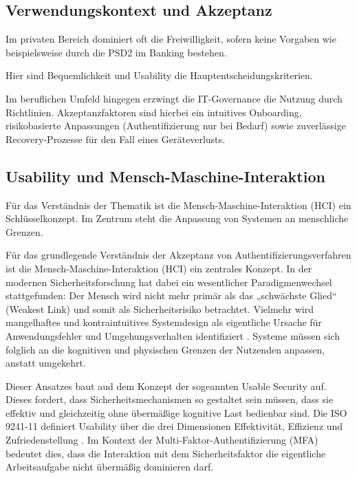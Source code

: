 \subsection{Verwendungskontext und Akzeptanz}
Im privaten Bereich dominiert oft die Freiwilligkeit, sofern keine Vorgaben wie beispielsweise durch die PSD2 im Banking bestehen. %

Hier sind Bequemlichkeit und Usability die Hauptentscheidungskriterien.

Im beruflichen Umfeld hingegen erzwingt die IT-Governance die Nutzung durch Richtlinien. Akzeptanzfaktoren sind hierbei ein intuitives Onboarding, risikobasierte Anpassungen (Authentifizierung nur bei Bedarf) sowie zuverlässige Recovery-Prozesse für den Fall eines Geräteverlusts.

\subsection{Usability und Mensch-Maschine-Interaktion}
Für das Verständnis der Thematik ist die Mensch-Maschine-Interaktion (HCI) ein Schlüsselkonzept. Im Zentrum steht die Anpassung von Systemen an menschliche Grenzen.

Für das grundlegende Verständnis der Akzeptanz von Authentifizierungsverfahren ist die Mensch-Maschine-Interaktion (HCI) ein zentrales Konzept. In der modernen Sicherheitsforschung hat dabei ein wesentlicher Paradigmenwechsel stattgefunden: Der Mensch wird nicht mehr primär als das „schwächste Glied“ ({Weakest Link}) und somit als Sicherheitsrisiko betrachtet. Vielmehr wird mangelhaftes und kontraintuitives Systemdesign als eigentliche Ursache für Anwendungsfehler und Umgehungsverhalten identifiziert \cite[S. 345]{gratian2018}. Systeme müssen sich folglich an die kognitiven und physischen Grenzen der Nutzenden anpassen, anstatt umgekehrt.

Dieser Ansatzes baut aud dem Konzept der sogeannten Usable Security auf. Dieses fordert, dass Sicherheitsmechanismen so gestaltet sein müssen, dass sie effektiv und gleichzeitig ohne übermäßige kognitive Last bedienbar sind. Die ISO 9241-11 definiert Usability über die drei Dimensionen Effektivität, Effizienz und Zufriedenstellung \cite[S. 42]{bortz2016}. Im Kontext der Multi-Faktor-Authentifizierung (MFA) bedeutet dies, dass die Interaktion mit dem Sicherheitsfaktor die eigentliche Arbeitsaufgabe nicht übermäßig dominieren darf.

